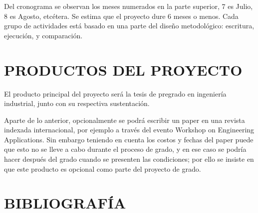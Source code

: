 \documentclass{article}
\begin{document}
Del cronograma se observan los meses numerados en la parte superior, 7 es Julio,
8 es Agosto, etcétera. Se estima que el proyecto dure 6 meses o menos. Cada grupo
de actividades está basado en una parte del diseño metodológico: escritura,
ejecución, y comparación.

\section{PRODUCTOS DEL PROYECTO}

El producto principal del proyecto será la tesis de pregrado en ingeniería
industrial, junto con su respectiva sustentación.

\vspace{\baselineskip}
Aparte de lo anterior, opcionalmente se podrá escribir un paper en una revista
indexada internacional, por ejemplo a través del evento Workshop on Engineering
Applications. Sin embargo teniendo en cuenta los costos y fechas del paper
puede que esto no se lleve a cabo durante el proceso de grado, y en ese caso
se podría hacer después del grado cuando se presenten las condiciones; por 
ello se insiste en que este producto es opcional como parte del proyecto de
grado.

\section{BIBLIOGRAFÍA}

\printbibliography[heading=none]
\end{document}
